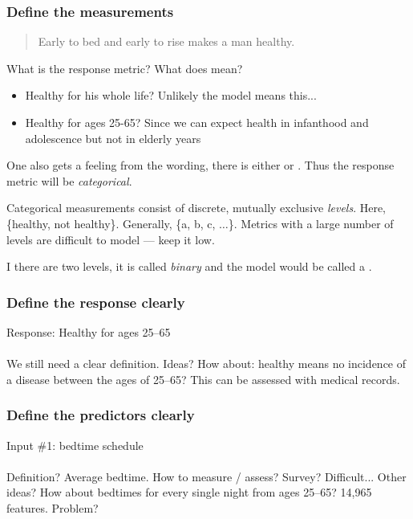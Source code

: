 \documentclass[slides]{beamer} %
\begin{document}
\begin{frame}\frametitle{Define the measurements}

\small
\begin{quotation}
Early to bed and early to rise makes a man healthy.
\end{quotation}

What is the response metric? \pause What does  mean?\\

\begin{itemize}
\item Healthy for his whole life? Unlikely the model means this...
\item Healthy for ages 25-65? Since we can expect health in infanthood and adolescence but not in elderly years
\end{itemize}

One also gets a feeling from the wording, there is either  or . Thus the response metric will be \textit{categorical}. \\\vspace{0.2cm}

Categorical measurements consist of discrete, mutually exclusive \textit{levels}. Here, \{healthy, not healthy\}. Generally, \{a, b, c, $\ldots$\}. Metrics with a large number of levels are difficult to model --- keep it low.\\\vspace{0.2cm}

I there are two levels, it is called \textit{binary} and the model would be called a .
	
\end{frame}

\begin{frame}\frametitle{Define the response clearly}

Response: Healthy for ages 25--65 \\~\\

We still need a clear definition. Ideas? How about: healthy means no incidence of a  disease between the ages of 25--65? This can be assessed with medical records. 
	
\end{frame}

\begin{frame}\frametitle{Define the predictors clearly}

Input \#1: bedtime schedule \\~\\

Definition? \pause Average bedtime. \pause How to measure / assess? Survey? Difficult... Other ideas? How about bedtimes for every single night from ages 25--65? 14,965 features. Problem?
	
\end{frame}
\end{document}
